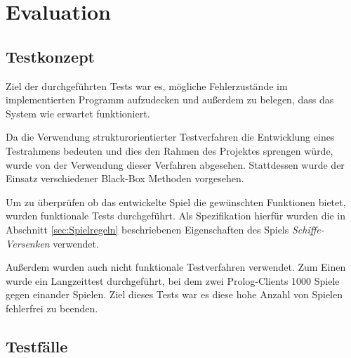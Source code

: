 \section{Evaluation} \label{sec:Evaluation}

\subsection{Testkonzept}

	Ziel der durchgeführten Tests war es, mögliche Fehlerzustände im implementierten Programm aufzudecken und außerdem zu belegen, dass das System
	wie erwartet funktioniert. 
	
	Da die Verwendung strukturorientierter Testverfahren die Entwicklung eines Testrahmens bedeuten und dies den Rahmen des Projektes sprengen würde,
	wurde von der Verwendung dieser Verfahren abgesehen.  
	Stattdessen wurde der Einsatz verschiedener Black-Box Methoden vorgesehen.
	
	Um zu überprüfen ob das entwickelte Spiel die gewünschten Funktionen bietet, wurden funktionale Tests durchgeführt. 
	Als Spezifikation hierfür wurden die in Abschnitt \ref{sec:Spielregeln} beschriebenen Eigenschaften des Spiels \textit{Schiffe-Versenken}
	verwendet. 
	
	
	Außerdem wurden auch nicht funktionale Testverfahren verwendet. Zum Einen wurde ein Langzeittest durchgeführt, bei dem zwei
	Prolog-Clients 1000 Spiele gegen einander Spielen. Ziel dieses Tests war es diese hohe Anzahl von Spielen fehlerfrei zu beenden. 	
	

\subsection{Testfälle}

